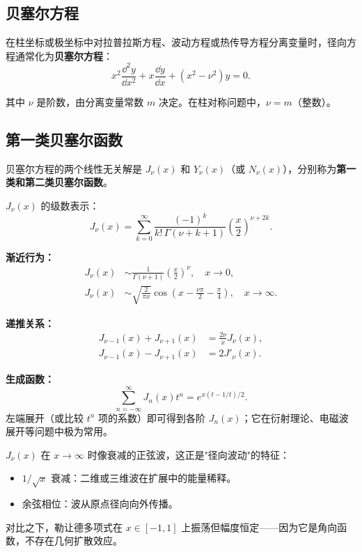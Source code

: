 \subsection{贝塞尔方程}

在柱坐标或极坐标中对拉普拉斯方程、波动方程或热传导方程分离变量时，径向方程通常化为\textbf{贝塞尔方程}：
\begin{equation}
x^2\frac{\dd^2 y}{\dd x^2} + x\frac{\dd y}{\dd x} + (x^2 - \nu^2)y = 0.
\label{eq:bessel_ode}
\end{equation}

其中 $\nu$ 是阶数，由分离变量常数 $m$ 决定。在柱对称问题中，$\nu = m$（整数）。

\subsection{第一类贝塞尔函数}

贝塞尔方程的两个线性无关解是 $J_\nu(x)$ 和 $Y_\nu(x)$（或 $N_\nu(x)$），分别称为\textbf{第一类和第二类贝塞尔函数}。

$J_\nu(x)$ 的级数表示：
\begin{equation}
J_\nu(x) = \sum_{k=0}^{\infty}
\frac{(-1)^k}{k!\,\Gamma(\nu+k+1)}\left(\frac{x}{2}\right)^{\nu+2k}.
\label{eq:bessel_series}
\end{equation}

\textbf{渐近行为：}
\begin{align}
J_\nu(x) &\sim \frac{1}{\Gamma(\nu+1)}\left(\frac{x}{2}\right)^\nu,\quad x\to 0,\\
J_\nu(x) &\sim \sqrt{\frac{2}{\pi x}}\cos\left(x - \frac{\nu\pi}{2} - \frac{\pi}{4}\right),\quad x\to\infty.
\label{eq:bessel_asym}
\end{align}

\textbf{递推关系：}
\begin{align}
J_{\nu-1}(x) + J_{\nu+1}(x) &= \frac{2\nu}{x}J_\nu(x),\\
J_{\nu-1}(x) - J_{\nu+1}(x) &= 2J'_\nu(x).
\end{align}

\textbf{生成函数：}
\begin{equation}
\sum_{n=-\infty}^{\infty} J_n(x)t^n = e^{x(t-1/t)/2}.
\label{eq:bessel_genfunc}
\end{equation}
左端展开（或比较 $t^n$ 项的系数）即可得到各阶 $J_n(x)$；它在衍射理论、电磁波展开等问题中极为常用。

\begin{insight}
$J_\nu(x)$ 在 $x\to\infty$ 时像衰减的正弦波，这正是"径向波动"的特征：
\begin{itemize}
\item $1/\sqrt{x}$ 衰减：二维或三维波在扩展中的能量稀释。
\item 余弦相位：波从原点径向向外传播。
\end{itemize}
对比之下，勒让德多项式在 $x\in[-1,1]$ 上振荡但幅度恒定——因为它是角向函数，不存在几何扩散效应。
\end{insight}

